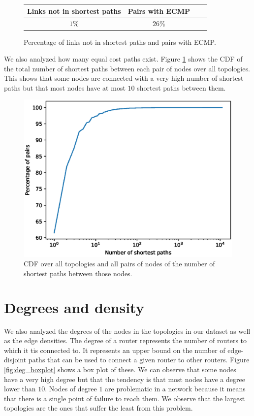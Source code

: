 \begin{figure}
\begin{center}
\begin{tabular}{cccc}
\toprule
Links not in shortest paths & Pairs with ECMP \\
\midrule
$1\%$ & $26\%$  \\
\bottomrule
\end{tabular}
\end{center}
\caption{Percentage of links not in shortest paths and pairs with ECMP.}
\label{fig:ECMPcount}
\end{figure}

We also analyzed how many equal cost paths exist. Figure \ref{fig:ECMPcount} shows the CDF of the total number of shortest paths between each pair
of nodes over all topologies. This shows that some nodes are connected with a very high number of shortest paths but that most nodes have at most
$10$ shortest paths between them.

\begin{figure}
\begin{center}
\includegraphics[width=.85\columnwidth]{./Network-lib/data/plot/spCount.eps}
\end{center}
\caption{CDF over all topologies and all pairs of nodes of the number of shortest paths between those nodes.}
\label{fig:maxEDP_boxplot}
\end{figure}

\section{Degrees and density}

We also analyzed the degrees of the nodes in the topologies in our dataset as well as the edge densities. The degree of a router represents the
number of routers to which it tis connected to. It represents an upper bound on the number of edge-disjoint paths that can be used to
connect a given router to other routers. Figure \ref{fig:deg_boxplot} shows a box plot of these. We can observe that some nodes have a very
high degree but that the tendency is that most nodes have a degree lower than $10$. Nodes of degree $1$ are problematic in a network
because it means that there is a single point of failure to reach them. We observe that the largest topologies are the ones that suffer the least
from this problem.

